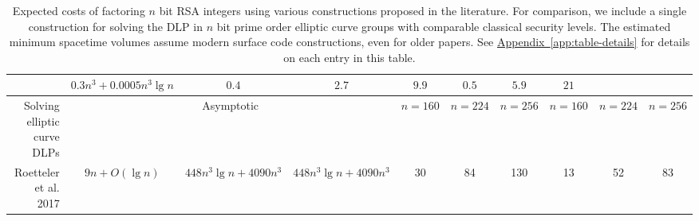 \documentclass[superscriptaddress,notitlepage,longbibliography]{revtex4-1}
\theoremstyle{definition}
\theoremstyle{definition}
\DeclareRobustCommand{\app}[1]{\hyperref[app:#1]{Appendix~\ref*{app:#1}}}
\begin{document}
\begin{table}[p]
{\begin{tabular}{r||c|c|c||c|c|c||c|c|c}
    &{\boldmath $0.3 n^3 + 0.0005 n^3 \lg n$}
        &{\boldmath $0.4$}
        &{\boldmath $2.7$}
        &{\boldmath $9.9$}
            &{\boldmath $0.5$}
            &{\boldmath $5.9$}
            &{\boldmath $21$}
                \\
\hline
Solving elliptic curve DLPs
    &\multicolumn{3}{c||}{Asymptotic}
        &$n=160$ &$n=224$ &$n=256$
            &$n=160$ &$n=224$ &$n=256$
                \\
\hline
Roetteler et al. 2017 \cite{roetteler2017quantum}
    &$9n + O(\lg n)$
    &$448 n^3 \lg n + 4090 n^3$
    &$448 n^3 \lg n + 4090 n^3$
        &30
        &84
        &130
            &13
            &52
            &83
  \end{tabular}
  }
  \caption{
    Expected costs of factoring $n$ bit RSA integers using various constructions proposed in the literature.
    For comparison, we include a single construction for solving the DLP in $n$ bit prime order elliptic curve groups with comparable classical security levels.
    The estimated minimum spacetime volumes assume modern surface code constructions, even for older papers.
    See \app{table-details} for details on each entry in this table.
  }
\end{table}
\end{document}
